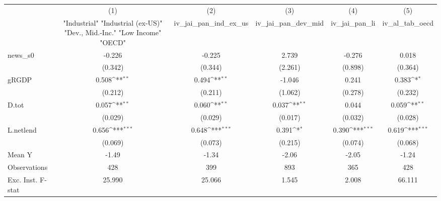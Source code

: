 {
\def\sym#1{\ifmmode^{#1}\else\(^{#1}\)\fi}
\begin{tabular}{l*{5}{c}}
\toprule
            &\multicolumn{1}{c}{(1)}&\multicolumn{1}{c}{(2)}&\multicolumn{1}{c}{(3)}&\multicolumn{1}{c}{(4)}&\multicolumn{1}{c}{(5)}\\
            &\multicolumn{1}{c}{ "Industrial" "Industrial (ex-US)" "Dev., Mid.-Inc." "Low Income" "OECD" }&\multicolumn{1}{c}{iv\_jai\_pan\_ind\_ex\_us}&\multicolumn{1}{c}{iv\_jai\_pan\_dev\_mid}&\multicolumn{1}{c}{iv\_jai\_pan\_li}&\multicolumn{1}{c}{iv\_al\_tab\_oecd}\\
\midrule
news\_s0     &      -0.226         &      -0.225         &       2.739         &      -0.276         &       0.018         \\
            &     (0.342)         &     (0.344)         &     (2.261)         &     (0.898)         &     (0.364)         \\
\addlinespace
gRGDP       &       0.508\sym{**} &       0.494\sym{**} &      -1.046         &       0.241         &       0.383\sym{*}  \\
            &     (0.212)         &     (0.211)         &     (1.062)         &     (0.278)         &     (0.232)         \\
\addlinespace
D.tot       &       0.057\sym{**} &       0.060\sym{**} &       0.037\sym{**} &       0.044         &       0.059\sym{**} \\
            &     (0.029)         &     (0.029)         &     (0.017)         &     (0.032)         &     (0.028)         \\
\addlinespace
L.netlend   &       0.656\sym{***}&       0.648\sym{***}&       0.391\sym{*}  &       0.390\sym{***}&       0.619\sym{***}\\
            &     (0.069)         &     (0.073)         &     (0.215)         &     (0.074)         &     (0.068)         \\
\midrule
Mean Y      &       -1.49         &       -1.34         &       -2.06         &       -2.05         &       -1.24         \\
Observations&         428         &         399         &         893         &         365         &         428         \\
Exc. Inst. F-stat&      25.990         &      25.066         &       1.545         &       2.008         &      66.111         \\
\bottomrule
\end{tabular}
}
